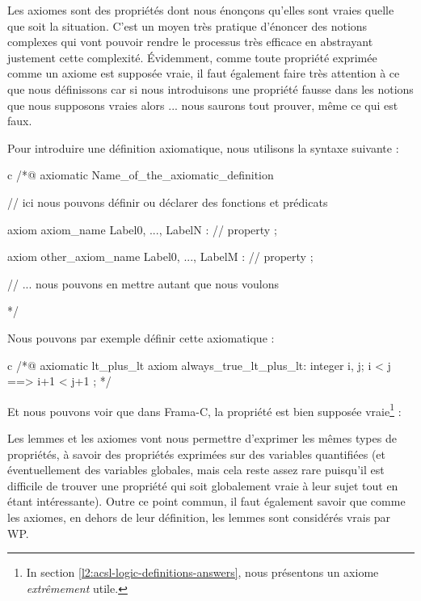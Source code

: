 
Les axiomes sont des propriétés dont nous énonçons qu'elles sont vraies quelle
que soit la situation. C'est un moyen très pratique d'énoncer des notions
complexes qui vont pouvoir rendre le processus très efficace en abstrayant
justement cette complexité. Évidemment, comme toute propriété exprimée comme un
axiome est supposée vraie, il faut également faire très attention à ce que nous
définissons car si nous introduisons une propriété fausse dans les notions que
nous supposons vraies alors ... nous saurons tout prouver, même ce qui est faux.





Pour introduire une définition axiomatique, nous utilisons la syntaxe suivante :



\begin{CodeBlock}{c}
/*@
  axiomatic Name_of_the_axiomatic_definition {
    // ici nous pouvons définir ou déclarer des fonctions et prédicats

    axiom axiom_name { Label0, ..., LabelN }:
      // property ;

    axiom other_axiom_name { Label0, ..., LabelM }:
      // property ;

    // ... nous pouvons en mettre autant que nous voulons
  }
*/
\end{CodeBlock}



Nous pouvons par exemple définir cette axiomatique :



\begin{CodeBlock}{c}
/*@
  axiomatic lt_plus_lt{
    axiom always_true_lt_plus_lt:
      \forall integer i, j; i < j ==> i+1 < j+1 ;
  }
*/
\end{CodeBlock}



Et nous pouvons voir que dans Frama-C, la propriété est bien supposée
vraie\footnote{In section \ref{l2:acsl-logic-definitions-answers}, nous
présentons un axiome {\em extrêmement} utile.} :






Les lemmes et les axiomes vont nous permettre d'exprimer les mêmes types de
propriétés, à savoir des propriétés exprimées sur des variables quantifiées (et
éventuellement des variables globales, mais cela reste assez rare puisqu'il est
difficile de trouver une propriété qui soit globalement vraie à leur sujet tout
en étant intéressante). Outre ce point commun, il faut également savoir que
comme les axiomes, en dehors de leur définition, les lemmes sont considérés
vrais par WP.



